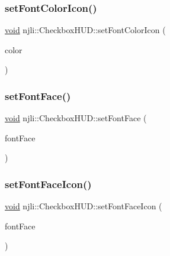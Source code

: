 \mbox{\label{classnjli_1_1_checkbox_h_u_d_ab23a6ab181e6698b8653c0c8f45a5b78}} 
\subsubsection{\texorpdfstring{set\+Font\+Color\+Icon()}{setFontColorIcon()}}
{\footnotesize\ttfamily \mbox{\hyperlink{_thread_8h_af1e856da2e658414cb2456cb6f7ebc66}{void}} njli\+::\+Checkbox\+H\+U\+D\+::set\+Font\+Color\+Icon (\begin{DoxyParamCaption}\item[{const bt\+Vector4 \&}]{color }\end{DoxyParamCaption})}

\mbox{\label{classnjli_1_1_checkbox_h_u_d_ae4b99948d4cc44e2ddd6f1b8b2e6cbf0}} 
\subsubsection{\texorpdfstring{set\+Font\+Face()}{setFontFace()}}
{\footnotesize\ttfamily \mbox{\hyperlink{_thread_8h_af1e856da2e658414cb2456cb6f7ebc66}{void}} njli\+::\+Checkbox\+H\+U\+D\+::set\+Font\+Face (\begin{DoxyParamCaption}\item[{const char $\ast$}]{font\+Face }\end{DoxyParamCaption})}

\mbox{\label{classnjli_1_1_checkbox_h_u_d_a9f5a683fa1eadb2844f1d7735e01f389}} 
\subsubsection{\texorpdfstring{set\+Font\+Face\+Icon()}{setFontFaceIcon()}}
{\footnotesize\ttfamily \mbox{\hyperlink{_thread_8h_af1e856da2e658414cb2456cb6f7ebc66}{void}} njli\+::\+Checkbox\+H\+U\+D\+::set\+Font\+Face\+Icon (\begin{DoxyParamCaption}\item[{const char $\ast$}]{font\+Face }\end{DoxyParamCaption})}

